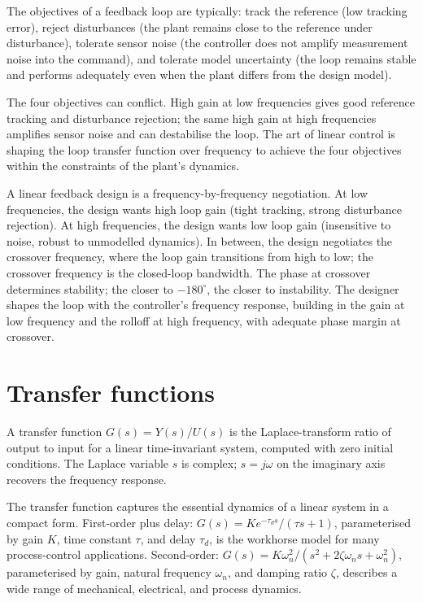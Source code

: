 The objectives of a feedback loop are typically: track the reference (low tracking error), reject disturbances (the plant remains close to the reference under disturbance), tolerate sensor noise (the controller does not amplify measurement noise into the command), and tolerate model uncertainty (the loop remains stable and performs adequately even when the plant differs from the design model).

The four objectives can conflict. High gain at low frequencies gives good reference tracking and disturbance rejection; the same high gain at high frequencies amplifies sensor noise and can destabilise the loop. The art of linear control is shaping the loop transfer function over frequency to achieve the four objectives within the constraints of the plant's dynamics.

\begin{archetype}
A linear feedback design is a frequency-by-frequency negotiation. At low frequencies, the design wants high loop gain (tight tracking, strong disturbance rejection). At high frequencies, the design wants low loop gain (insensitive to noise, robust to unmodelled dynamics). In between, the design negotiates the crossover frequency, where the loop gain transitions from high to low; the crossover frequency is the closed-loop bandwidth. The phase at crossover determines stability; the closer to $-180^\circ$, the closer to instability. The designer shapes the loop with the controller's frequency response, building in the gain at low frequency and the rolloff at high frequency, with adequate phase margin at crossover.
\end{archetype}

\section{Transfer functions}

A transfer function $G(s) = Y(s)/U(s)$ is the Laplace-transform ratio of output to input for a linear time-invariant system, computed with zero initial conditions. The Laplace variable $s$ is complex; $s = j\omega$ on the imaginary axis recovers the frequency response.

The transfer function captures the essential dynamics of a linear system in a compact form. First-order plus delay: $G(s) = K e^{-\tau_d s}/(\tau s + 1)$, parameterised by gain $K$, time constant $\tau$, and delay $\tau_d$, is the workhorse model for many process-control applications. Second-order: $G(s) = K \omega_n^2 / (s^2 + 2\zeta \omega_n s + \omega_n^2)$, parameterised by gain, natural frequency $\omega_n$, and damping ratio $\zeta$, describes a wide range of mechanical, electrical, and process dynamics.

